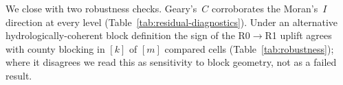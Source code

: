 We close with two robustness checks. Geary's~$C$ corroborates the Moran's~$I$
direction at every level (Table~\ref{tab:residual-diagnostics}). Under an
alternative hydrologically-coherent block definition the sign of the
R0$\rightarrow$R1 uplift agrees with county blocking in $[k]$ of $[m]$ compared
cells (Table~\ref{tab:robustness}); where it disagrees we read this as
sensitivity to block geometry, not as a failed result.
